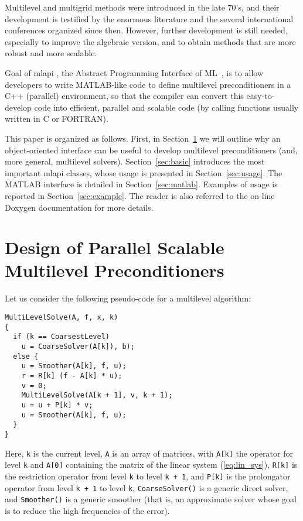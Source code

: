 \documentclass{article}[11pt]
\newcommand{\MLAPI}  {{\sc mlapi }}
\begin{document}
\medskip

Multilevel and multigrid methods were introduced in the late 70's, and their
development is testified by the enormous literature and the several
international conferences organized since then. However, further development
is still needed, especially to improve the algebraic version, and to obtain
methods that are more robust and more scalable.

Goal of \MLAPI, the Abstract Programming Interface of ML~\cite{ml-guide}, is
to allow developers to write MATLAB-like code to define multilevel
preconditioners in a C++ (parallel) environment, so that the compiler can
convert this easy-to-develop code into efficient, parallel and scalable code
(by calling functions usually written in C or FORTRAN).

\medskip

This paper is organized as follows. First, in Section~\ref{sec:design}
we will outline why an object-oriented interface can be useful to develop
multilevel preconditioners (and, more general, multilevel solvers).
Section~\ref{sec:basic} introduces the most important \MLAPI classes, whose
usage is presented in Section~\ref{sec:usage}. The MATLAB interface is
detailed in Section~\ref{sec:matlab}. Examples of usage is reported in
Section~\ref{sec:example}. The reader is also referred to the on-line Doxygen
documentation for more details.

\section{Design of Parallel Scalable Multilevel Preconditioners}
\label{sec:design}

Let us consider the following pseudo-code for a multilevel algorithm:
\begin{verbatim}
MultiLevelSolve(A, f, x, k) 
{
  if (k == CoarsestLevel)
    u = CoarseSolver(A[k]), b);
  else {
    u = Smoother(A[k], f, u);
    r = R[k] (f - A[k] * u);
    v = 0;
    MultiLevelSolve(A[k + 1], v, k + 1);
    u = u + P[k] * v;
    u = Smoother(A[k], f, u);
  }
}
\end{verbatim}
Here, \verb!k! is the current level,
\verb!A! is an array of matrices, with \verb!A[k]! the operator for 
level \verb!k! and \verb!A[0]! containing the matrix of the linear system 
(\ref{eq:lin_sys}), 
\verb!R[k]! is the restriction operator from level \verb!k! 
to level \verb!k + 1!, and \verb!P[k]! is the prolongator
operator from level \verb!k + 1! to level \verb!k!,
\verb!CoarseSolver()! is a generic direct solver, and
\verb!Smoother()! is a generic smoother (that is, an approximate solver
whose goal is to reduce the high frequencies of the error).
\end{document}
